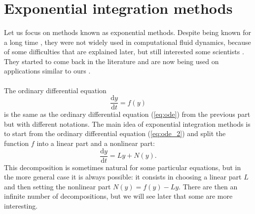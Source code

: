   \section{Exponential integration methods}

    \paragraph{}
    Let us focus on methods known as exponential methods.
    Despite being known for a long time \cite{Pope1963}, they were not widely used in computational fluid dynamics, because of some difficulties that are explained later, but still interested some scientists \cite{EdwardsTuckermanFriesnerEtAl1994}.
    They started to come back in the literature \cite{HochbruckOstermann2005, HochbruckOstermann2010} and are now being used on applications similar to ours \cite{NieZhangZhao2006, BhattKhaliqWade2018}.

    \paragraph{}
    The ordinary differential equation
    \begin{equation}\label{eq:ode_2}
      \frac{\mathrm{d} y}{\mathrm{d} t} = f\left(y\right)
    \end{equation}
    is the same as the ordinary differential equation (\ref{eq:ode}) from the previous part but with different notations.
    The main idea of exponential integration methods is to start from the ordinary differential equation (\ref{eq:ode_2}) and split the function $f$ into a linear part and a nonlinear part:
    \begin{equation}\label{eq:ode_split}
      \frac{\mathrm{d} y}{\mathrm{d} t} = Ly + N\left(y\right) .
    \end{equation}
    This decomposition is sometimes natural for some particular equations, but in the more general case it is always possible: it consists in choosing a linear part $L$ and then setting the nonlinear part $N\left(y\right) = f(y) - Ly$.
    There are then an infinite number of decompositions, but we will see later that some are more interesting.

